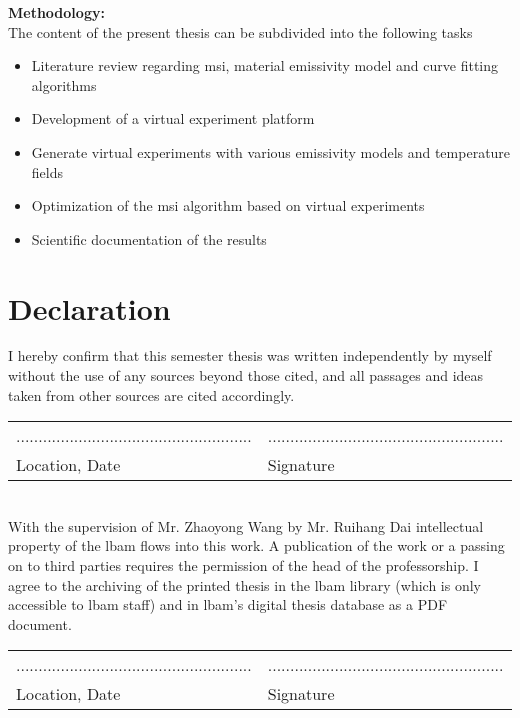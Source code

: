 \textbf{Methodology:} \\
The content of the present thesis can be subdivided into the following tasks
\begin{itemize}
	\item Literature review regarding \gls{msi}, material emissivity model and curve fitting 
	algorithms
	\item Development of a virtual experiment platform
	\item Generate virtual experiments with various emissivity models and temperature fields
	\item Optimization of the \gls{msi} algorithm based on virtual experiments
	\item Scientific documentation of the results
\end{itemize}

\chapter*{Declaration}
I hereby confirm that this semester thesis was written independently 
by myself without the use of any sources beyond those cited, and all
passages and ideas taken from other sources are cited accordingly.%
%
\vspace{5cm}\\
\begin{tabular}{p{0.5\linewidth}p{0.5\linewidth} }
	.....................................................		& .....................................................\\
	Location, Date  	& Signature
\end{tabular}
%
\vspace{2cm}\\
%
With the supervision of Mr. Zhaoyong Wang by Mr. Ruihang Dai intellectual property of the \gls{lbam}  flows into this work. A publication of the work or a passing on to third parties requires the permission of the head of the professorship. I agree to the archiving of the printed thesis in the  \gls{lbam} library (which is only accessible to \gls{lbam} staff) and in \gls{lbam}'s digital thesis database as a PDF document.%
%
\vfill
%
\begin{tabular}{p{0.5\linewidth}p{0.5\linewidth} }
	.....................................................		& .....................................................\\
    Location, Date  	& Signature
\end{tabular}
